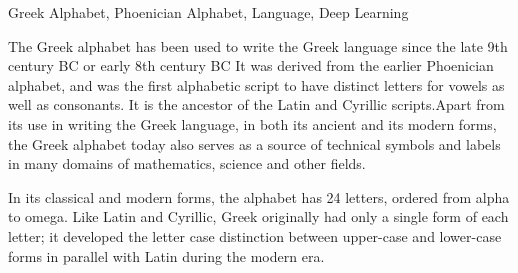 \documentclass[master]{dutthesis} %
\begin{document}
\begin{englishabstract}{Greek Alphabet, Phoenician Alphabet, Language, Deep Learning}

The Greek alphabet has been used to write the Greek language since the late 9th
century BC or early 8th century BC It was derived from the earlier
Phoenician alphabet, and was the first alphabetic script to have distinct
letters for vowels as well as consonants. It is the ancestor of the Latin
and Cyrillic scripts.Apart from its use in writing the Greek language, in
both its ancient and its modern forms, the Greek alphabet today also serves
as a source of technical symbols and labels in many domains of mathematics,
science and other fields. \par
In its classical and modern forms, the alphabet has 24 letters, ordered from
alpha to omega. Like Latin and Cyrillic, Greek originally had only a single
form of each letter; it developed the letter case distinction between
upper-case and lower-case forms in parallel with Latin during the modern era.
\end{englishabstract}
\tableofcontents
\tableofengcontents
\cleardoublepage

\tableoffigurecontents
\tableoftablecontents
\stcleardp


\end{document}
